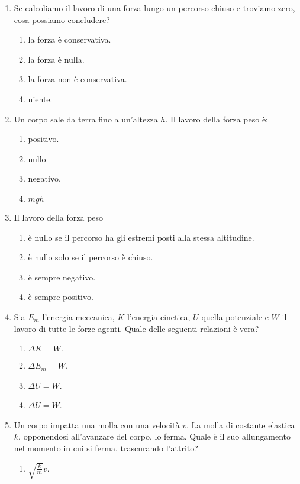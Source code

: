 \documentclass{article}
\begin{document}
\begin{enumerate}
\begin{enumerate}[label=\Alph*.]
  \end{enumerate}
  \item Se calcoliamo il lavoro di una forza lungo un percorso chiuso e troviamo zero, cosa possiamo concludere?
  \begin{enumerate}[label=\Alph*.]
    \item la forza è conservativa.
    \item la forza è nulla.
    \item la forza non è conservativa.
    \item niente.
  \end{enumerate}
  \item Un corpo sale da terra fino a un'altezza $h$. Il lavoro della forza peso è:
  \begin{enumerate}[label=\Alph*.]
    \item positivo.
    \item nullo
    \item negativo.
    \item $mgh$
  \end{enumerate}
  \item Il lavoro della forza peso
  \begin{enumerate}[label=\Alph*.]
    \item è nullo se il percorso ha gli estremi posti alla stessa altitudine.
    \item è nullo solo se il percorso è chiuso.
    \item è sempre negativo.
    \item è sempre positivo.
  \end{enumerate}
  \item Sia $E_m$ l'energia meccanica, $K$ l'energia cinetica, $U$ quella potenziale e $W$ il lavoro di tutte le forze agenti. Quale delle seguenti relazioni è vera?
  \begin{enumerate}[label=\Alph*.]
    \item $\Delta K=W.$
    \item $\Delta E_m=W$.
    \item $\Delta U=W$.
    \item $\Delta U=W$.
  \end{enumerate}
  \item Un corpo impatta una molla con una velocità $v$. La molla di costante elastica $k$, opponendosi all'avanzare del corpo, lo ferma. Quale è il suo allungamento nel momento in cui si ferma, trascurando l'attrito?
  \begin{enumerate}[label=\Alph*.]
    \item $\sqrt{\frac{k}{m}}v$.

\end{enumerate}
\end{enumerate}
\end{document}
